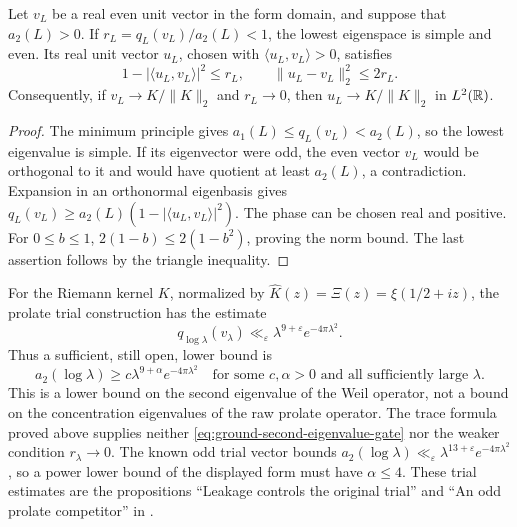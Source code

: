 \begin{proposition}
\label{prop:ground-vector-ratio}
Let $v_L$ be a real even unit vector in the form domain, and suppose
that $a_2(L)>0$. If $r_L=q_L(v_L)/a_2(L)<1$, the lowest eigenspace
is simple and even. Its real unit vector $u_L$, chosen with
$\langle u_L,v_L\rangle>0$, satisfies
\[
 1-|\langle u_L,v_L\rangle|^2\leq r_L,
 \qquad \|u_L-v_L\|_2^2\leq2r_L.
\]
Consequently, if $v_L\to K/\|K\|_2$ and $r_L\to0$, then
$u_L\to K/\|K\|_2$ in $L^2(\mathbb R)$.
\end{proposition}
\begin{proof}
The minimum principle gives $a_1(L)\leq q_L(v_L)<a_2(L)$, so the
lowest eigenvalue is simple. If its eigenvector were odd, the even
vector $v_L$ would be orthogonal to it and would have quotient at least
$a_2(L)$, a contradiction. Expansion in an orthonormal eigenbasis
gives
$q_L(v_L)\geq a_2(L)(1-|\langle u_L,v_L\rangle|^2)$.
The phase can be chosen real and positive. For $0\leq b\leq1$,
$2(1-b)\leq2(1-b^2)$, proving the norm bound. The last assertion
follows by the triangle inequality.
\end{proof}

For the Riemann kernel $K$, normalized by
$\widehat K(z)=\Xi(z)=\xi(1/2+iz)$, the prolate trial construction
has the estimate
\[
 q_{\log\lambda}(v_\lambda)
       \ll_\varepsilon\lambda^{9+\varepsilon}e^{-4\pi\lambda^2}.
\]
Thus a sufficient, still open, lower bound is
\begin{equation}\label{eq:ground-second-eigenvalue-gate}
 a_2(\log\lambda)\geq c\lambda^{9+\alpha}e^{-4\pi\lambda^2}
 \quad\text{for some }c,\alpha>0\text{ and all sufficiently large }\lambda.
\end{equation}
This is a lower bound on the second eigenvalue of the Weil operator,
not a bound on the concentration eigenvalues of the raw prolate
operator. The trace formula proved above supplies neither
\eqref{eq:ground-second-eigenvalue-gate} nor the weaker condition
$r_\lambda\to0$. The known odd trial vector bounds
$a_2(\log\lambda)\ll_\varepsilon
\lambda^{13+\varepsilon}e^{-4\pi\lambda^2}$, so a power lower bound
of the displayed form must have $\alpha\leq4$. These trial estimates
are the propositions ``Leakage controls the original trial'' and
``An odd prolate competitor'' in
\citet[section ``The prolate trials and their Rayleigh upper bounds'']
{simplicitynotes}.

